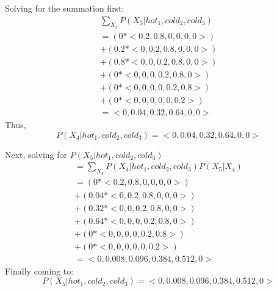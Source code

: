 \documentclass{article}
\begin{document}
\begin{enumerate}[a)]
    Solving for the summation first:
    \begin{gather*}
        \sum_{X_3}P(X_3|hot_1,cold_2,cold_3)\\
        = (0 * <0.2, 0.8, 0, 0, 0, 0>)\\
        + (0.2 * <0, 0.2, 0.8, 0, 0, 0>)\\
        + (0.8 * <0, 0, 0.2, 0.8, 0, 0>)\\
        + (0 * <0, 0, 0, 0.2, 0.8, 0>)\\
        + (0 * <0, 0, 0, 0, 0.2, 0.8>)\\
        + (0 * <0, 0, 0, 0, 0, 0.2>)\\
        = <0, 0.04, 0.32, 0.64, 0, 0>
    \end{gather*}
    Thus,
    \[
        P(X_4|hot_1,cold_2,cold_3) = <0, 0.04, 0.32, 0.64, 0, 0>
    \]
    
    Next, solving for $P(X_5|hot_1,cold_2,cold_3)$
    \begin{gather*}
        = \sum_{X_4}P(X_4|hot_1,cold_2,cold_3)P(X_5|X_4)\\
        = (0 * <0.2, 0.8, 0, 0, 0, 0>)\\
        + (0.04 * <0, 0.2, 0.8, 0, 0, 0>)\\
        + (0.32 * <0, 0, 0.2, 0.8, 0, 0>)\\
        + (0.64 * <0, 0, 0, 0.2, 0.8, 0>)\\
        + (0 * <0, 0, 0, 0, 0.2, 0.8>)\\
        + (0 * <0, 0, 0, 0, 0, 0.2>)\\
        = <0, 0.008, 0.096, 0.384, 0.512, 0>
    \end{gather*}
    Finally coming to:
    \[
        P(X_5|hot_1,cold_2,cold_3) = <0, 0.008, 0.096, 0.384, 0.512, 0>
    \]
\end{enumerate}

\newpage
\end{document}
